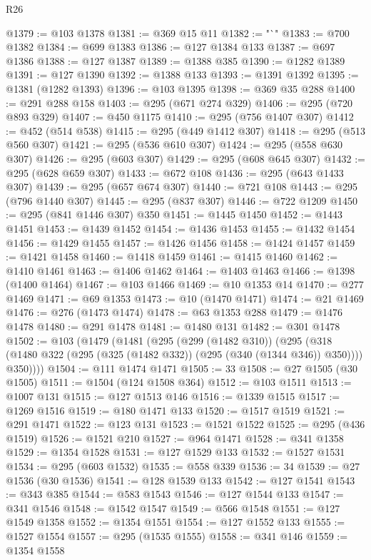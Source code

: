\begin{lexlean}{R26}
\begin{coremodule}
@1379 := @103 @1378
@1381 := @369 @15 @11
@1382 := "`"
@1383 := @700 @1382
@1384 := @699 @1383
@1386 := @127 @1384 @133
@1387 := @697 @1386
@1388 := @127 @1387
@1389 := @1388 @385
@1390 := @1282 @1389
@1391 := @127 @1390
@1392 := @1388 @133
@1393 := @1391 @1392
@1395 := @1381 (@1282 @1393)
@1396 := @103 @1395
@1398 := @369 @35 @288
@1400 := @291 @288 @158
@1403 := @295 (@671 @274 @329)
@1406 := @295 (@720 @893 @329)
@1407 := @450 @1175
@1410 := @295 (@756 @1407 @307)
@1412 := @452 (@514 @538)
@1415 := @295 (@449 @1412 @307)
@1418 := @295 (@513 @560 @307)
@1421 := @295 (@536 @610 @307)
@1424 := @295 (@558 @630 @307)
@1426 := @295 (@603 @307)
@1429 := @295 (@608 @645 @307)
@1432 := @295 (@628 @659 @307)
@1433 := @672 @108
@1436 := @295 (@643 @1433 @307)
@1439 := @295 (@657 @674 @307)
@1440 := @721 @108
@1443 := @295 (@796 @1440 @307)
@1445 := @295 (@837 @307)
@1446 := @722 @1209
@1450 := @295 (@841 @1446 @307) @350
@1451 := @1445 @1450
@1452 := @1443 @1451
@1453 := @1439 @1452
@1454 := @1436 @1453
@1455 := @1432 @1454
@1456 := @1429 @1455
@1457 := @1426 @1456
@1458 := @1424 @1457
@1459 := @1421 @1458
@1460 := @1418 @1459
@1461 := @1415 @1460
@1462 := @1410 @1461
@1463 := @1406 @1462
@1464 := @1403 @1463
@1466 := @1398 (@1400 @1464)
@1467 := @103 @1466
@1469 := @10 @1353 @14
@1470 := @277 @1469
@1471 := @69 @1353
@1473 := @10 (@1470 @1471)
@1474 := @21 @1469
@1476 := @276 (@1473 @1474)
@1478 := @63 @1353 @288
@1479 := @1476 @1478
@1480 := @291 @1478
@1481 := @1480 @131
@1482 := @301 @1478
@1502 := @103
    (@1479
      (@1481
        (@295
          (@299 (@1482 @310))
          (@295
            (@318 (@1480 @322 (@295 (@325 (@1482 @332)) (@295 (@340 (@1344 @346)) @350))))
            @350))))
@1504 := @111 @1474 @1471
@1505 := 33
@1508 := @27 @1505 (@30 @1505)
@1511 := @1504 (@124 @1508 @364)
@1512 := @103 @1511
@1513 := @1007 @131
@1515 := @127 @1513 @146
@1516 := @1339 @1515
@1517 := @1269 @1516
@1519 := @180 @1471 @133
@1520 := @1517 @1519
@1521 := @291 @1471
@1522 := @123 @131
@1523 := @1521 @1522
@1525 := @295 (@436 @1519)
@1526 := @1521 @210
@1527 := @964 @1471
@1528 := @341 @1358
@1529 := @1354 @1528
@1531 := @127 @1529 @133
@1532 := @1527 @1531
@1534 := @295 (@603 @1532)
@1535 := @558 @339
@1536 := 34
@1539 := @27 @1536 (@30 @1536)
@1541 := @128 @1539 @133
@1542 := @127 @1541
@1543 := @343 @385
@1544 := @583 @1543
@1546 := @127 @1544 @133
@1547 := @341 @1546
@1548 := @1542 @1547
@1549 := @566 @1548
@1551 := @127 @1549 @1358
@1552 := @1354 @1551
@1554 := @127 @1552 @133
@1555 := @1527 @1554
@1557 := @295 (@1535 @1555)
@1558 := @341 @146
@1559 := @1354 @1558

\end{coremodule}
\end{lexlean}
